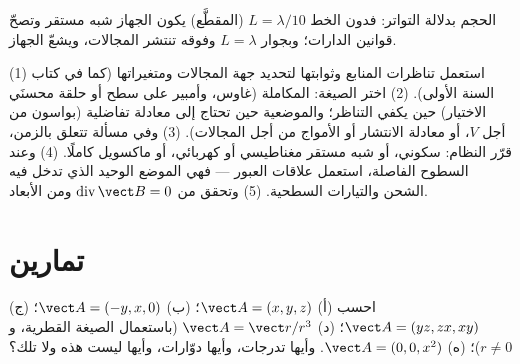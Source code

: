 \begin{omfigure}

{\small الحجم بدلالة التواتر: فدون الخط $L = \lambda/10$ (المقطَّع) يكون
الجهاز شبه مستقر وتصحّ قوانين الدارات؛ وبجوار $L = \lambda$ وفوقه
تنتشر المجالات، ويشعّ الجهاز.}
\end{omfigure}

\begin{method}\label{met:b2:maxwell-equations:method}
(1) استعمل تناظرات المنابع وثوابتها لتحديد
جهة المجالات ومتغيراتها (كما في كتاب السنة الأولى).
(2) اختر الصيغة: المكاملة (غاوس، وأمبير على سطح أو حلقة
محسنَي الاختيار) حين يكفي التناظر؛ والموضعية حين تحتاج إلى
معادلة تفاضلية (بواسون من أجل $V$، أو معادلة الانتشار أو الأمواج
من أجل المجالات). (3) وفي مسألة تتعلق بالزمن، قرّر النظام:
سكوني، أو شبه مستقر مغناطيسي أو كهربائي، أو ماكسويل كاملًا. (4)
وعند السطوح الفاصلة، استعمل علاقات العبور --- فهي الموضع الوحيد
الذي تدخل فيه الشحن والتيارات السطحية. (5) وتحقق من
$\operatorname{div}\vect B = 0$ ومن الأبعاد.
\end{method}

\section{تمارين}

\begin{exercise}[$\star$]\label{exo:b2:maxwell-equations:1}
احسب   (أ) $\vect A = (x, y, z)$؛ (ب)
$\vect A = (-y, x, 0)$؛ (ج) $\vect A = (yz, zx, xy)$؛ (د) $\vect A = \vect r/r^3$
(باستعمال الصيغة القطرية، و $r \ne 0$)؛ (ه) $\vect A = (0, 0, x^2)$. وأيها
تدرجات، وأيها دوّارات، وأيها ليست هذه ولا تلك؟
\end{exercise}

